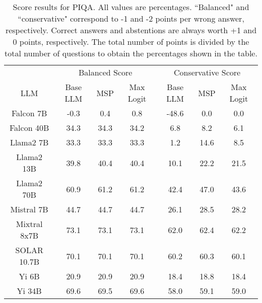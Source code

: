 \begin{table*}
\centering
\begin{tabular}{c|c|c|c|c|c|c}
& \multicolumn{3}{c|}{Balanced Score} & \multicolumn{3}{c}{Conservative Score} \\ 
LLM & Base LLM & MSP & Max Logit & Base LLM & MSP & Max Logit\\ \hline
Falcon 7B & -0.3 & 0.4 & 0.8 & -48.6 & 0.0 & 0.0\\
Falcon 40B & 34.3 & 34.3 & 34.2 & 6.8 & 8.2 & 6.1\\
Llama2 7B & 33.3 & 33.3 & 33.3 & 1.2 & 14.6 & 8.5\\
Llama2 13B & 39.8 & 40.4 & 40.4 & 10.1 & 22.2 & 21.5\\
Llama2 70B & 60.9 & 61.2 & 61.2 & 42.4 & 47.0 & 43.6\\
Mistral 7B & 44.7 & 44.7 & 44.7 & 26.1 & 28.5 & 28.2\\
Mixtral 8x7B & 73.1 & 73.1 & 73.1 & 62.0 & 62.4 & 62.2\\
SOLAR 10.7B & 70.1 & 70.1 & 70.1 & 60.2 & 60.3 & 60.1\\
Yi 6B & 20.9 & 20.9 & 20.9 & 18.4 & 18.8 & 18.4\\
Yi 34B & 69.6 & 69.5 & 69.6 & 58.0 & 59.1 & 59.0\\
\hline
\end{tabular}
\caption{Score results for PIQA. All values are percentages. ``Balanced" and ``conservative" correspond to -1 and -2 points per wrong answer, respectively. Correct answers and abstentions are always worth +1 and 0 points, respectively. The total number of points is divided by the total number of questions to obtain the percentages shown in the table.}
\label{tab:piqa_score}
\end{table*}
